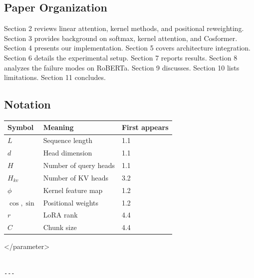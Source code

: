 \subsection{Paper Organization}

Section 2 reviews linear attention, kernel methods, and positional 
reweighting. Section 3 provides background on softmax, kernel attention, 
and Cosformer. Section 4 presents our implementation. Section 5 covers 
architecture integration. Section 6 details the experimental setup. 
Section 7 reports results. Section 8 analyzes the failure modes on 
RoBERTa. Section 9 discusses. Section 10 lists limitations. Section 11 
concludes.



\subsection{Notation}

\begin{table}[H]
\centering
\small
\begin{tabular}{lll}
\toprule
\textbf{Symbol} & \textbf{Meaning} & \textbf{First appears} \\
\midrule
$L$ & Sequence length & 1.1 \\
$d$ & Head dimension & 1.1 \\
$H$ & Number of query heads & 1.1 \\
$H_{kv}$ & Number of KV heads & 3.2 \\
$\phi$ & Kernel feature map & 1.2 \\
$\cos, \sin$ & Positional weights & 1.2 \\
$r$ & LoRA rank & 4.4 \\
$C$ & Chunk size & 4.4 \\
\bottomrule
\end{tabular}
\end{table}
</parameter>
\begin{lstlisting}

---
\end{lstlisting}